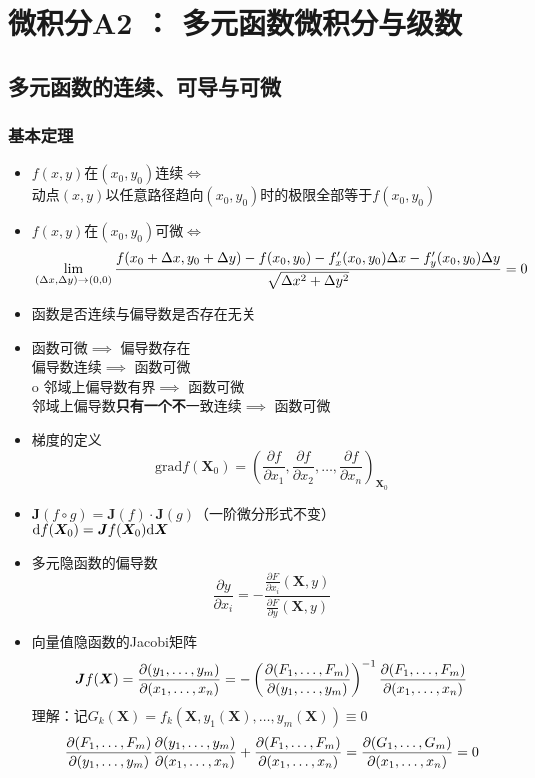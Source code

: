 \documentclass[./main.tex]{subfiles}
\begin{document}
\chapter{微积分A2 ： 多元函数微积分与级数}
\section{多元函数的连续、可导与可微}
\subsection{基本定理}
\begin{itemize}
  \item $f(x,y)$在$(x_0,y_0)$连续$\iff$\\动点$(x,y)$以任意路径趋向$(x_0,y_0)$时的极限全部等于$f(x_0,y_0)$
  \item $f(x,y)\text{在}(x_0,y_0)\text{可微}\iff$ $$\\\lim\limits_{(\Delta{x},\Delta{y})\rightarrow (0,0)}\frac{f(x_0+\Delta{x},y_0+\Delta{y})-f(x_0,y_0)-f_x^\prime(x_0,y_0)\Delta{x}-f_y^\prime(x_0,y_0)\Delta{y}}{\sqrt{\Delta{x}^2+\Delta{y}^2}}=0$$
  \item 函数是否连续与偏导数是否存在无关
  \item 函数可微$\implies$ 偏导数存在\\
  偏导数连续$\implies$ 函数可微\\o
  邻域上偏导数有界$\implies$ 函数可微\\
  邻域上偏导数\textbf{只有一个不}一致连续$\implies$ 函数可微
  \item 梯度的定义$$\text{grad}f(\bm{X}_0)=\left( \frac{\partial f}{\partial x_1}, \frac{\partial f}{\partial x_2},\dots, \frac{\partial f}{\partial x_n} \right)_{\bm{X}_0}$$
  \item $\bm{J}(f\circ g)=\bm{J}(f)\cdot \bm{J}(g) $（一阶微分形式不变）\\
  $\text{d}f(\bm{X}_0)=\bm{J}f(\bm{X}_0)\text{d}\bm{X}$
  \item 多元隐函数的偏导数 $$\frac{\partial y}{\partial x_i}=-\frac{\frac{\partial F}{\partial x_i}(\bm{X},y)}{\frac{\partial F}{\partial y}(\bm{X},y)}$$
  \item 向量值隐函数的Jacobi矩阵
  $$\bm{J}f(\bm{X})=\frac{\partial(y_1,\dots,y_m)}{\partial(x_1,\dots,x_n)}=-\left(\frac{\partial(F_1,\dots,F_m)}{\partial(y_1,\dots,y_m)}\right)^{-1}\frac{\partial(F_1,\dots,F_m)}{\partial(x_1,\dots,x_n)}$$
  理解：记$G_k(\bm{X})=f_k(\bm{X},y_1(\bm{X}),\dots,y_m(\bm{X}))\equiv 0$ $$\frac{\partial(F_1,\dots,F_m)}{\partial(y_1,\dots,y_m)}\frac{\partial(y_1,\dots,y_m)}{\partial(x_1,\dots,x_n)}+\frac{\partial(F_1,\dots,F_m)}{\partial(x_1,\dots,x_n)}=\frac{\partial(G_1,\dots,G_m)}{\partial(x_1,\dots,x_n)}=0$$

\end{itemize}
\end{document}
